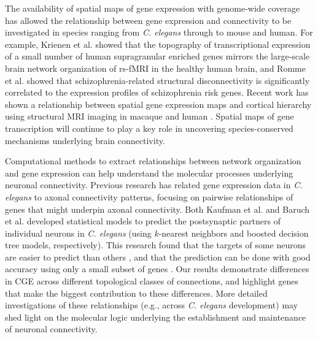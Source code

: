\documentclass[10pt,letterpaper]{article}
\begin{document}
{%
\color{teal}
The availability of spatial maps of gene expression with genome-wide coverage has allowed the relationship between gene expression and connectivity to be investigated in species ranging from \textit{C. elegans} through to mouse and human.
For example, Krienen et al. \cite{Krienen:2016eq} showed that the topography of transcriptional expression of a small number of human supragranular enriched genes mirrors the large-scale brain network organization of rs-fMRI in the healthy human brain, and Romme et al. \cite{Romme2016} showed that schizophrenia-related structural disconnectivity is significantly correlated to the expression profiles of schizophrenia risk genes.
Recent work has shown a relationship between spatial gene expression maps and cortical hierarchy using structural MRI imaging in macaque and human \cite{Burt2017}.
Spatial maps of gene transcription will continue to play a key role in uncovering species-conserved mechanisms underlying brain connectivity.

Computational methods to extract relationships between network organization and gene expression can help understand the molecular processes underlying neuronal connectivity.
Previous research has related gene expression data in \textit{C. elegans} to axonal connectivity patterns, focusing on pairwise relationships of genes that might underpin axonal connectivity.
Both Kaufman et al. \cite{Kaufman2006} and Baruch et al. \cite{Baruch2008} developed statistical models to predict the postsynaptic partners of individual neurons in \textit{C. elegans} (using $k$-nearest neighbors and boosted decision tree models, respectively).
This research found that the targets of some neurons are easier to predict than others \cite{Kaufman2006}, and that the prediction can be done with good accuracy using only a small subset of genes \cite{Baruch2008}.
Our results demonstrate differences in CGE across different topological classes of connections, and highlight genes that make the biggest contribution to these differences.
More detailed investigations of these relationships (e.g., across \textit{C. elegans} development) may shed light on the molecular logic underlying the establishment and maintenance of neuronal connectivity.
 \color{black}

}
\end{document}
